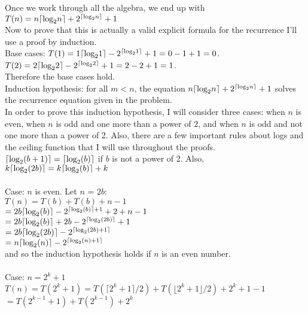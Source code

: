 \documentclass{article}
\begin{document}
\begin{enumerate}
	Once we work through all the algebra, we end up with $T(n) = n\lceil\textup{log}_2n\rceil + 2 ^{\lceil\textup{log}_2n\rceil} + 1$ \\
	Now to prove that this is actually a valid explicit formula for the recurrence I'll use a proof by induction. \\
	Base cases: $T(1) = 1\lceil\textup{log}_21\rceil - 2 ^{\lceil\textup{log}_21\rceil} + 1 = 0 - 1 + 1 = 0$.  \\
	$T(2) = 2\lceil\textup{log}_22\rceil - 2 ^{\lceil\textup{log}_22\rceil} + 1 = 2 - 2 + 1 = 1$.  \\
	Therefore the base cases hold.  \\
	Induction hypothesis: for all $m < n$, the equation $n\lceil\textup{log}_2n\rceil + 2 ^{\lceil\textup{log}_2n\rceil} + 1$ solves the recurrence equation given in the problem.  \\
	In order to prove this induction hypothesis, I will consider three cases: when $n$ is even, when $n$ is odd and one more than a power of 2, and when $n$ is odd and not one more than a power of 2. Also, there are a few important rules about logs and the ceiling function that I will use throughout the proofs.  $\lceil\textup{log}_2(b + 1) \rceil = \lceil\textup{log}_2(b) \rceil$ if $b$ is not a power of 2.  Also, $k\lceil\textup{log}_2(2b) \rceil = k\lceil\textup{log}_2(b) \rceil + k$ \\\\
	Case: $n$ is even.  Let $n$ = $2b$: \\
	$T(n) = T(b) + T(b)  + n - 1$ \\
	$	  = 2b\lceil\textup{log}_2(b) \rceil - 2 ^ {\lceil\textup{log}_2(b) \rceil + 1} + 2 + n - 1$ \\
	$	  = 2b\lceil\textup{log}_2(b) \rceil + 2b - 2 ^ {\lceil\textup{log}_2(2b) \rceil} + 1$ \\
	$	  = 2b\lceil\textup{log}_2(2b) \rceil - 2 ^ {\lceil\textup{log}_2(2b) + 1\rceil}$ \\
	$	  = n\lceil\textup{log}_2(n) \rceil - 2 ^ {\lceil\textup{log}_2(n) + 1\rceil}$ \\
	and so the induction hypothesis holds if $n$ is an even number.  \\\\
	Case: $n = 2^k + 1$ \\
	$T(n) = T(2^k+1) = T(\lceil 2^k + 1 \rceil / 2) + T(\lfloor 2^k + 1 \rfloor / 2) + 2^k + 1 - 1 $\\
	$	  = T(2^{k-1} + 1) + T(2^{k - 1}) + 2^k$ \\

\end{enumerate}
\end{document}
